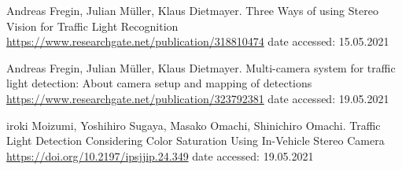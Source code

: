 \documentclass[letterpaper, 10 pt, conference]{ieeeconf}  %
\begin{document}

\begin{thebibliography}{99}

 Andreas Fregin, Julian M\"uller, Klaus Dietmayer. Three  Ways  of  using  Stereo  Vision  for  Traffic  Light  Recognition \url{https://www.researchgate.net/publication/318810474} date accessed: 15.05.2021

 Andreas Fregin, Julian M\"uller, Klaus Dietmayer. Multi-camera system for traffic light detection: About camera setup and mapping of detections \url{https://www.researchgate.net/publication/323792381} date accessed: 19.05.2021

 iroki Moizumi, Yoshihiro Sugaya, Masako Omachi, Shinichiro Omachi. Traffic Light Detection Considering Color Saturation Using In-Vehicle Stereo Camera \url{https://doi.org/10.2197/ipsjjip.24.349} date accessed: 19.05.2021

\end{thebibliography}
\end{document}

